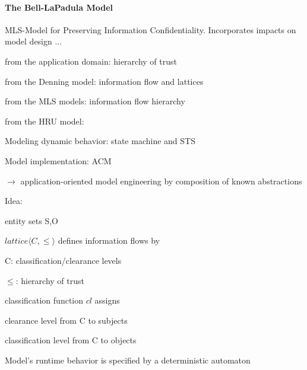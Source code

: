 \documentclass[a4paper]{article}
\begin{document}
\begin{multicols}{3}
    \paragraph{The Bell-LaPadula Model}
    MLS-Model for Preserving Information Confidentiality.
    Incorporates impacts on model design ...
    \begin{itemize*}
        \item from the application domain: hierarchy of trust
        \item from the Denning model: information flow and lattices
        \item from the MLS models: information flow hierarchy
        \item from the HRU model:
        \begin{itemize*}
            \item Modeling dynamic behavior: state machine and STS
            \item Model implementation: ACM
        \end{itemize*}
        \item[$\rightarrow$] application-oriented model engineering by composition of known abstractions
    \end{itemize*}

    Idea:
    \begin{itemize*}
        \item entity sets S,O
        \item $lattice\langle C,\leq\rangle$ defines information flows by
        \begin{itemize*}
            \item C: classification/clearance levels
            \item $\leq$: hierarchy of trust
        \end{itemize*}
        \item classification function $cl$ assigns
        \begin{itemize*}
            \item clearance level from C to subjects
            \item classification level from C to objects
        \end{itemize*}
        \item Model’s runtime behavior is specified by a deterministic automaton
    \end{itemize*}


\end{multicols}
\end{document}
